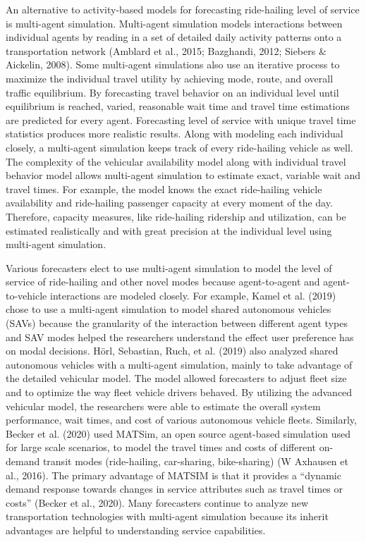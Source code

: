 \documentclass[fancy, masters]{byuthesis}
\begin{document}
An alternative to activity-based models for forecasting ride-hailing level of service is multi-agent simulation. Multi-agent simulation models interactions between individual agents by reading in a set of detailed daily activity patterns onto a transportation network (Amblard et al., 2015; Bazghandi, 2012; Siebers \& Aickelin, 2008). Some multi-agent simulations also use an iterative process to maximize the individual travel utility by achieving mode, route, and overall traffic equilibrium. By forecasting travel behavior on an individual level until equilibrium is reached, varied, reasonable wait time and travel time estimations are predicted for every agent. Forecasting level of service with unique travel time statistics produces more realistic results. Along with modeling each individual closely, a multi-agent simulation keeps track of every ride-hailing vehicle as well. The complexity of the vehicular availability model along with individual travel behavior model allows multi-agent simulation to estimate exact, variable wait and travel times. For example, the model knows the exact ride-hailing vehicle availability and ride-hailing passenger capacity at every moment of the day. Therefore, capacity measures, like ride-hailing ridership and utilization, can be estimated realistically and with great precision at the individual level using multi-agent simulation.

Various forecasters elect to use multi-agent simulation to model the level of service of ride-hailing and other novel modes because agent-to-agent and agent-to-vehicle interactions are modeled closely. For example, Kamel et al. (2019) chose to use a multi-agent simulation to model shared autonomous vehicles (SAVs) because the granularity of the interaction between different agent types and SAV modes helped the researchers understand the effect user preference has on modal decisions. Hörl, Sebastian, Ruch, et al. (2019) also analyzed shared autonomous vehicles with a multi-agent simulation, mainly to take advantage of the detailed vehicular model. The model allowed forecasters to adjust fleet size and to optimize the way fleet vehicle drivers behaved. By utilizing the advanced vehicular model, the researchers were able to estimate the overall system performance, wait times, and cost of various autonomous vehicle fleets. Similarly, Becker et al. (2020) used MATSim, an open source agent-based simulation used for large scale scenarios, to model the travel times and costs of different on-demand transit modes (ride-hailing, car-sharing, bike-sharing) (W Axhausen et al., 2016). The primary advantage of MATSIM is that it provides a ``dynamic demand response towards changes in service attributes such as travel times or costs'' (Becker et al., 2020). Many forecasters continue to analyze new transportation technologies with multi-agent simulation because its inherit advantages are helpful to understanding service capabilities.
\end{document}
